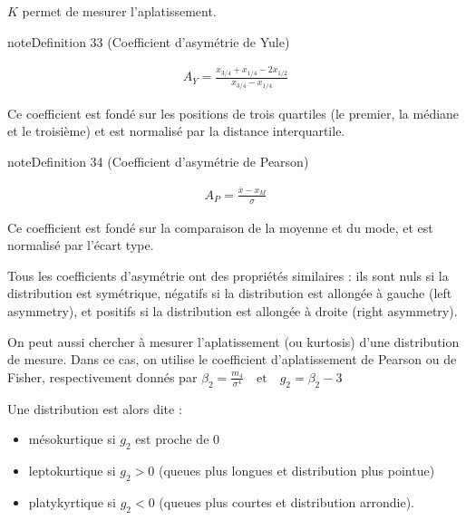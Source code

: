 \documentclass[letterpaper,10pt,french]{sphinxmanual}
\begin{document}
\sphinxAtStartPar
\(K\) permet de mesurer l’aplatissement.
\label{statsdescriptives:definition-17}
\begin{sphinxadmonition}{note}{Definition 33 (Coefficient d’asymétrie de Yule)}


\begin{equation*}
\begin{split}A_Y = \frac{x_{3/4}+x_{1/4}-2x_{1/2}}{x_{3/4}-x_{1/4}}\end{split}
\end{equation*}\end{sphinxadmonition}

\sphinxAtStartPar
Ce coefficient est fondé sur les positions de trois quartiles (le premier, la médiane et le troisième) et est normalisé par la distance interquartile.
\label{statsdescriptives:definition-18}
\begin{sphinxadmonition}{note}{Definition 34 (Coefficient d’asymétrie de Pearson)}


\begin{equation*}
\begin{split}A_P = \frac{\bar{x}-x_M}{\sigma}\end{split}
\end{equation*}\end{sphinxadmonition}

\sphinxAtStartPar
Ce coefficient est fondé sur la comparaison de la moyenne et du mode, et est normalisé par l’écart type.

\sphinxAtStartPar
Tous les coefficients d’asymétrie ont des propriétés similaires : ils sont nuls si la distribution est symétrique, négatifs si la distribution est allongée à gauche (left asymmetry), et positifs si la distribution est allongée à droite (right asymmetry).

\sphinxAtStartPar
On peut aussi chercher à mesurer l’aplatissement (ou kurtosis) d’une distribution de mesure. Dans ce cas, on utilise le coefficient d’aplatissement de Pearson ou de Fisher, respectivement donnés par
\(\beta_2=\frac{m_4}{\sigma^4}\quad\textrm{et}\quad g_2=\beta_2-3\)

\sphinxAtStartPar
Une distribution est alors dite :
\begin{itemize}
\item {} 
\sphinxAtStartPar
mésokurtique si \(g_2\) est proche de 0

\item {} 
\sphinxAtStartPar
leptokurtique si \(g_2>0\) (queues plus longues et distribution plus pointue)

\item {} 
\sphinxAtStartPar
platykyrtique si \(g_2<0\) (queues plus courtes et distribution arrondie).

\end{itemize}
\end{document}
